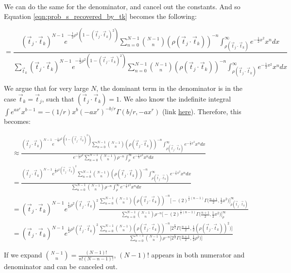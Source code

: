 \documentclass[12pt]{article}
\newcommand{\ptjtk}{\rho(\vec{t}_j\cdot\vec{t}_k)}
\newcommand{\tjtk}{(\vec{t}_j\cdot\vec{t}_k)}
\begin{document}
We can do the same for the denominator, and cancel out the constants. And so Equation \ref{eqn:prob_s_recovered_by_tk} becomes the following:
   
   \begin{equation}
   =  \frac{ \tjtk^{N-1}e^{-\frac{1}{2}\rho^2(1-\tjtk^2)} \sum_{n=0}^{N-1} \binom{N-1}{n} (\ptjtk)^{-n} \int^{\infty}_{\ptjtk} e^{-\frac{1}{2}x^2}x^n dx} { \sum_{\vec{t}_k} \tjtk^{N-1}e^{-\frac{1}{2}\rho^2(1-\tjtk^2)} \sum_{n=0}^{N-1} \binom{N-1}{n} (\ptjtk)^{-n} \int^{\infty}_{\ptjtk} e^{-\frac{1}{2}x^2}x^n dx}
   \end{equation}

We argue that for very large $N$, the dominant term in the denominator is in the case $\vec{t}_k = \vec{t}_j$, such that $\tjtk = 1$. We also know the indefinite integral $\int e^{ax^r}x^{b-1} = -(1/r) x^b (-ax^r)^{-b/r} \Gamma(b/r,-ax^r)$ (link \href{http://functions.wolfram.com/ElementaryFunctions/Exp/21/01/02/01/01/08/0001/}{here}). Therefore, this becomes:

   \begin{align}
   &\approx  \frac{ \tjtk^{N-1}e^{-\frac{1}{2}\rho^2(1-\tjtk^2)} \sum_{n=0}^{N-1} \binom{N-1}{n} (\ptjtk)^{-n} \int^{\infty}_{\ptjtk} e^{-\frac{1}{2}x^2}x^n dx} 
   { e^{-\frac{1}{2}\rho^2} \sum_{n=0}^{N-1} \binom{N-1}{n} \rho^{-n} \int^{\infty}_{\rho} e^{-\frac{1}{2}x^2}x^n dx} \\
   &= \frac{ \tjtk^{N-1}e^{\frac{1}{2}\rho^2\tjtk^2} \sum_{n=0}^{N-1} \binom{N-1}{n} (\ptjtk)^{-n} \int^{\infty}_{\ptjtk} e^{-\frac{1}{2}x^2}x^n dx} 
   { \sum_{n=0}^{N-1} \binom{N-1}{n} \rho^{-n} \int^{\infty}_{\rho} e^{-\frac{1}{2}x^2}x^n dx} \\
   &= \tjtk^{N-1}e^{\frac{1}{2}\rho^2\tjtk^2} \frac{ \sum_{n=0}^{N-1} \binom{N-1}{n} (\ptjtk)^{-n} \Big[ -(2)^{\frac{1}{2}(n-1)}\Gamma\Big(\frac{n+1}{2},\frac{1}{2}x^2\Big) \Big]^{\infty}_{\ptjtk} } 
   { \sum_{n=0}^{N-1} \binom{N-1}{n} \rho^{-n}  \Big[ -(2)^{\frac{1}{2}(n-1)}\Gamma\Big(\frac{n+1}{2},\frac{1}{2}x^2\Big) \Big]^{\infty}_{\rho} } \\
   &= \tjtk^{N-1}e^{\frac{1}{2}\rho^2\tjtk^2} \frac{ \sum_{n=0}^{N-1} \binom{N-1}{n} (\ptjtk)^{-n} \Big[ 2^{\frac{n}{2}}\Gamma\Big(\frac{n+1}{2},\frac{1}{2}(\ptjtk)^2\Big) \Big]} 
   { \sum_{n=0}^{N-1} \binom{N-1}{n} \rho^{-n}  \Big[ 2^{\frac{n}{2}}\Gamma\Big(\frac{n+1}{2},\frac{1}{2}\rho^2\Big) \Big] }
   \end{align}
   
If we expand $\binom{N-1}{n} = \frac{(N-1)!}{n!(N-n-1)!}$, $(N-1)!$ appears in both numerator and denominator and can be canceled out. 
\end{document}
